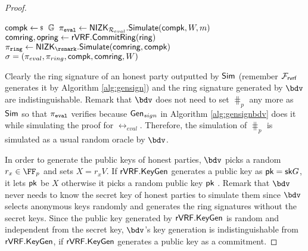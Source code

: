 \begin{proof}
	\begin{algorithm}
		\caption{$\gen_{sign}(\ring,W,\pk,\aux,m)$}
		\label{alg:gensignbdv}	 	
		\begin{algorithmic}[1]
			\State $ \compk\leftsample \grE$
			\State $ \pi_{\mathtt{eval}} \leftarrow {\ensuremath{\mathsf{NIZK}}}_{\mathcal{R}_{eval}}.{\mathsf{Simulate}}(\mathsf{compk}, W,m) $
			\State $ \mathsf{comring}, \mathsf{opring} \leftarrow {\ensuremath{\mathsf{rVRF}}}.{\mathsf{CommitRing}}(\mathsf{ring}) $
			\State $ \piring \leftarrow \NIZK_{\rsnark}.\Simulate(\comring, \compk) $ 
			\State\Return$ \sigma = (\pi_{eval},\pi_{ring},\mathsf{compk},\mathsf{comring},W) $
		\end{algorithmic}
		
	\end{algorithm}
	
	
	Clearly the ring signature of an honest party outputted by $ \mathsf{Sim} $ (remember $ \mathcal{F}_{\textsf{rvrf}}$ generates it by Algorithm \ref{alg:gensign}) and the ring signature generated by $ \bdv $ are indistinguishable. Remark that $ \bdv $ does not need to set $ \hash_p $ any more as $ \mathsf{Sim} $ so that $ \pi_{\mathtt{eval}} $ verifies because $ \mathsf{Gen}_{sign} $ in Algorithm \ref{alg:gensignbdv} does it while simulating the proof for $ \rel_{eval} $. Therefore, the simulation of $ \hash_p $ is simulated as a usual random oracle by $ \bdv $.
	
	In order to generate the public keys of honest parties, $ \bdv $ picks a random $ r_x\in \FF_p $ and sets $ X =r_xV$. If $ {\mathsf{rVRF}}.{\mathsf{KeyGen}} $  generates a public key as $ \mathsf{pk} = \mathsf{sk} G $, it lets $ \mathsf{pk} $ be $ X $ otherwise it picks a random public key $ \mathsf{pk} $ .
	Remark that $ \bdv$  never needs to know the secret key of honest parties to simulate them since $ \bdv $ selects anonymous keys randomly  and generates the ring signatures  without the secret keys. Since the public key generated by $ {\mathsf{rVRF}}.{\mathsf{KeyGen}} $ is random and independent from the secret key, $ \bdv $'s key generation is indistinguishable from $ {\mathsf{rVRF}}.{\mathsf{KeyGen}} $, if ${\mathsf{rVRF}}.{\mathsf{KeyGen}} $  generates a public key as a commitment.
	

\end{proof}
